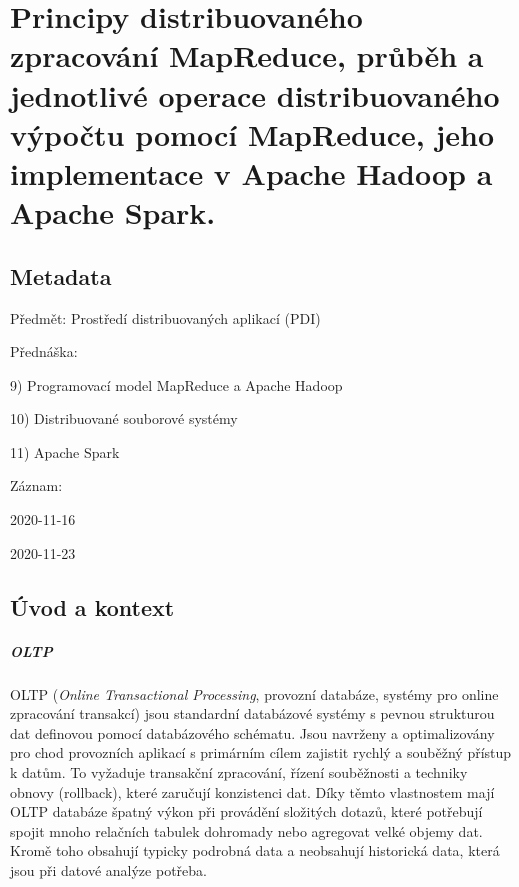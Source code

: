 

\chapter{Principy distribuovaného zpracování MapReduce, průběh a jednotlivé operace distribuovaného výpočtu pomocí MapReduce, jeho implementace v Apache Hadoop a Apache Spark.}


\section{Metadata}

\begin{compactitem}
    \item Předmět: Prostředí distribuovaných aplikací (PDI)
    \item Přednáška:
    \begin{compactitem}
        \item 9) Programovací model MapReduce a Apache Hadoop
        \item 10) Distribuované souborové systémy
        \item 11) Apache Spark
    \end{compactitem}
    \item Záznam:
    \begin{compactitem}
        \item 2020-11-16
        \item 2020-11-23
    \end{compactitem}
\end{compactitem}


\section{Úvod a kontext}

\paragraph*{OLTP} OLTP (\textit{Online Transactional Processing}, provozní databáze, systémy pro online zpracování transakcí) jsou standardní databázové systémy s pevnou strukturou dat definovou pomocí databázového schématu. Jsou navrženy a optimalizovány pro chod provozních aplikací s primárním cílem zajistit rychlý a souběžný přístup k datům. To vyžaduje transakční zpracování, řízení souběžnosti a techniky obnovy (rollback), které zaručují konzistenci dat. Díky těmto vlastnostem mají OLTP databáze špatný výkon při provádění složitých dotazů, které potřebují spojit mnoho relačních tabulek dohromady nebo agregovat velké objemy dat. Kromě toho obsahují typicky podrobná data a neobsahují historická data, která jsou při datové analýze potřeba.

